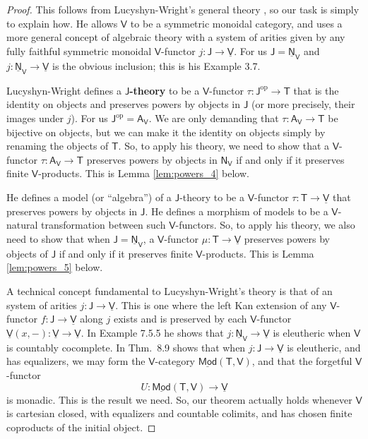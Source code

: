 \documentclass{amsart}
\newcommand{\define}[1]{{\bf \boldmath{#1}}}
\theoremstyle{definition}
\newcommand{\Mod}{\mathsf{Mod}}
\newcommand{\NN}{\mathsf{N}}
\newcommand{\A}{\mathsf{A}}
\newcommand{\V}{\mathsf{V}}
\newcommand{\J}{\mathsf{J}}
\newcommand{\T}{\mathsf{T}}
\newcommand{\op}{\mathrm{op}}
\newcommand{\maps}{\colon}
\begin{document}
\begin{proof}
This follows from Lucyshyn-Wright's general theory \cite{lucyshyn-wright}, so our task is simply to explain how.   He allows $\V$ to be a symmetric monoidal category, and uses a more general concept of algebraic theory with a system of arities given by any fully faithful symmetric monoidal $\V$-functor $j \maps \J \to \underline{\V}$.   For us $\J = \underline{\NN}_\V$ and $j \maps \underline{\NN}_\V \to \underline{\V}$ is the obvious inclusion; this is his Example 3.7.

Lucyshyn-Wright defines a \textbf{$\J$-theory} to be a $\V$-functor $\tau \maps \J^\op \to \T$ that is the identity on objects and preserves powers by objects in $\J$ (or more precisely, their images under $j$).  For us $\J^\op = \A_\V$.   We are only demanding that $\tau \maps \A_\V \to \T$ be bijective on objects, but we can make it the identity on objects simply by renaming the objects of $\T$.  So, to apply his theory, we need to show that a $\V$-functor $\tau \maps \A_\V \to \T$ preserves powers by objects in $\NN_\V$ if and only if it preserves finite $\V$-products.  This is Lemma \ref{lem:powers_4} below.

He defines a model (or ``algebra'') of a $\J$-theory to be a $\V$-functor $\tau \maps \T \to \underline{\V}$ that preserves powers by objects in $\J$.   He defines a morphism of models to be a $\V$-natural transformation between such $\V$-functors.  So, to apply his theory, we also need to show that when $\J = \underline{\NN}_\V$, a $\V$-functor $\mu \maps \T \to \underline{\V}$ preserves powers by objects of $\J$ if and only if it preserves finite $\V$-products.   This is Lemma \ref{lem:powers_5} below.

A technical concept fundamental to Lucyshyn-Wright's theory is that of an \define{eleutheric} system of arities $j \maps \J \to \underline{\V}$.  This is one where the left Kan extension of any $\V$-functor $f \maps \J \to \underline{\V}$ along $j$ exists and is preserved by each $\V$-functor $\underline{\V}(x,-) \maps \underline{\V} \to \underline{\V}$.  In Example 7.5.5 he shows that $j \maps \underline{\NN}_\V \to \underline{\V}$ is eleutheric when $\V$ is countably cocomplete.  In Thm.\ 8.9 shows that when $j \maps \J \to \underline{\V}$ is eleutheric, and has equalizers, we may form the $\V$-category $\underline{\Mod}(\T,\V)$, and that the forgetful $\V$-functor
\[   U \maps \underline{\Mod}(\T,\V) \to \underline{\V} \]
is monadic.  This is the result we need.   So, our theorem actually holds whenever $\V$ is cartesian closed, with equalizers and countable colimits, and has chosen finite coproducts of the initial object.  \end{proof}
\end{document}

